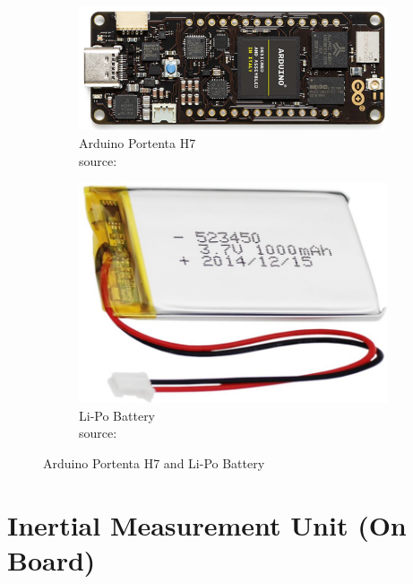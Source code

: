 \begin{figure}[h]
     \centering
     \begin{subfigure}[b]{0.49\textwidth}
         \centering
         \includegraphics[scale=0.2]{Images/Arduino Portenta H7.png}
         \captionsetup{justification=centering}
         \caption{Arduino Portenta H7 \\ source: \cite{ArduinoH72022}}
         \label{fig:Arduino Portenta H7}
     \end{subfigure}
     \hfill
     \begin{subfigure}[b]{0.49\textwidth}
         \centering
         \includegraphics[scale=0.2]{Images/Li-Po Battery.png}
         \caption{Li-Po Battery \\ source: \cite{wiki:Lithium_polymer_battery}}
         \label{fig:Li-Po Battery}
     \end{subfigure}
        \caption{Arduino Portenta H7 and Li-Po Battery}
        \label{fig:Arduino Portenta H7 and Li-Po Battery}
\end{figure}

\section{Inertial Measurement Unit (On Board)}

